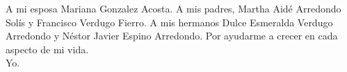 \begin{dedication}
A mi esposa Mariana Gonzalez Acosta. A mis padres, Martha Aidé Arredondo Solís y Francisco Verdugo Fierro.
A mis hermanos Dulce Esmeralda Verdugo Arredondo y Néstor Javier Espino Arredondo.
Por ayudarme a crecer en cada aspecto de mi vida.\\
Yo.
\end{dedication}
